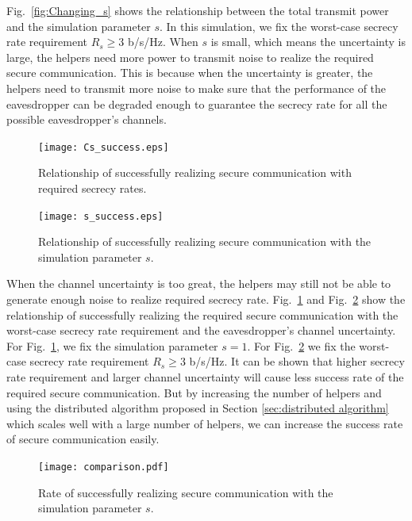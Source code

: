 \documentclass[journal]{IEEEtran}
\begin{document}
Fig.~\ref{fig:Changing_s} shows  the relationship between the total transmit power and the simulation parameter $s$. In this simulation, we fix the worst-case secrecy rate requirement $R_s \geq 3 $ b/s/Hz. When $s$ is small, which means the uncertainty is large, the helpers need more power to transmit noise to realize the required secure communication. This is because when the uncertainty is greater, the helpers need to transmit more noise to make sure that the performance of the eavesdropper can be degraded enough to guarantee the secrecy rate for all the possible eavesdropper's channels.

\begin{figure}[!ht]
	\centering
	\texttt{[image: Cs\_success.eps]} %
	\caption{Relationship of successfully realizing secure communication with required secrecy rates.}
	\label{fig:Cs_success}
\end{figure}
\begin{figure}[!ht]
	\centering
	\texttt{[image: s\_success.eps]} %
	\caption{Relationship of successfully realizing secure communication with the simulation parameter $s$.}
	\label{fig:s_success}
\end{figure}

When the channel uncertainty is too great, the helpers may still not be able to generate enough noise to realize required secrecy rate. Fig.~\ref{fig:Cs_success} and Fig.~\ref{fig:s_success} show the relationship of successfully realizing the required secure communication with the worst-case secrecy rate requirement and the eavesdropper's channel uncertainty. For Fig.~\ref{fig:Cs_success}, we fix the simulation parameter $s = 1$. For Fig.~\ref{fig:s_success} we fix the worst-case secrecy rate requirement $R_s \geq 3$ b/s/Hz. It can be shown that higher secrecy rate requirement and larger channel uncertainty will cause less success rate of the required secure communication. But by increasing the number of helpers and using the distributed algorithm proposed in Section \ref{sec:distributed algorithm} which scales well with a large number of helpers, we can increase the success rate of secure communication easily. 

\begin{figure}[!ht] %
	\centering
	\texttt{[image: comparison.pdf]} %
	\caption{Rate of successfully realizing secure communication with the simulation parameter $s$.}
	\label{fig:comparison}
\end{figure}
\end{document}
